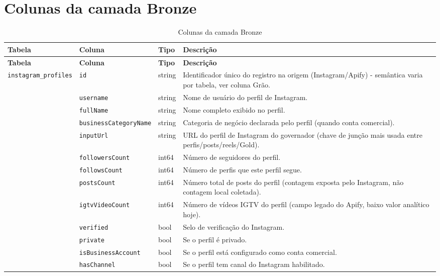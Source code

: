 \section*{Colunas da camada Bronze}
\begin{footnotesize}
\begin{longtable}{p{3.2cm}p{3.0cm}p{2.0cm}p{6.0cm}}
\caption{Colunas da camada Bronze}\\
\toprule \textbf{Tabela} & \textbf{Coluna} & \textbf{Tipo} & \textbf{Descrição} \\ \midrule \endfirsthead
\toprule \textbf{Tabela} & \textbf{Coluna} & \textbf{Tipo} & \textbf{Descrição} \\ \midrule \endhead
\bottomrule \endfoot
\texttt{instagram\_\allowbreak{}profiles} & \texttt{id} & string & Identificador único do registro na origem (Instagram/\allowbreak{}Apify) - semântica varia por tabela, ver coluna Grão. \\
\texttt{} & \texttt{username} & string & Nome de usuário do perfil de Instagram. \\
\texttt{} & \texttt{fullName} & string & Nome completo exibido no perfil. \\
\texttt{} & \texttt{businessCategoryName} & string & Categoria de negócio declarada pelo perfil (quando conta comercial). \\
\texttt{} & \texttt{inputUrl} & string & URL do perfil de Instagram do governador (chave de junção mais usada entre perfis/\allowbreak{}posts/\allowbreak{}reels/\allowbreak{}Gold). \\
\texttt{} & \texttt{followersCount} & int64 & Número de seguidores do perfil. \\
\texttt{} & \texttt{followsCount} & int64 & Número de perfis que este perfil segue. \\
\texttt{} & \texttt{postsCount} & int64 & Número total de posts do perfil (contagem exposta pelo Instagram, não contagem local coletada). \\
\texttt{} & \texttt{igtvVideoCount} & int64 & Número de vídeos IGTV do perfil (campo legado do Apify, baixo valor analítico hoje). \\
\texttt{} & \texttt{verified} & bool & Selo de verificação do Instagram. \\
\texttt{} & \texttt{private} & bool & Se o perfil é privado. \\
\texttt{} & \texttt{isBusinessAccount} & bool & Se o perfil está configurado como conta comercial. \\
\texttt{} & \texttt{hasChannel} & bool & Se o perfil tem canal do Instagram habilitado. \\

\end{longtable}
\end{footnotesize}
